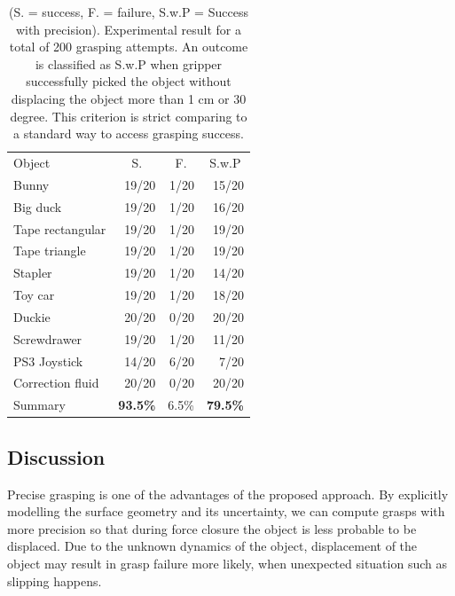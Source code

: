 \begin{table}[!htpb]
\centering
\begin{tabular}{lrrr}
Object           & \multicolumn{1}{c}{S.} & \multicolumn{1}{c}{F.} & \multicolumn{1}{c}{S.w.P} \\
Bunny            & 19/20                  & 1/20                   & 15/20                     \\
Big duck         & 19/20                  & 1/20                   & 16/20                     \\
Tape rectangular & 19/20                  & 1/20                   & 19/20                     \\
Tape triangle    & 19/20                  & 1/20                   & 19/20                     \\
Stapler          & 19/20                  & 1/20                   & 14/20                     \\
Toy car          & 19/20                  & 1/20                   & 18/20                     \\
Duckie           & 20/20                  & 0/20                   & 20/20                     \\
Screwdrawer      & 19/20                  & 1/20                   & 11/20                     \\
PS3 Joystick     & 14/20                  & 6/20                   & 7/20                      \\
Correction fluid & 20/20                  & 0/20                   & 20/20                     \\
Summary          & \textbf{93.5\%}        & 6.5\%            & \textbf{79.5\%}                  
\end{tabular}
\caption{(S. = success, F. = failure, S.w.P = Success with precision). Experimental result for a total of 200 grasping attempts. An outcome is classified as S.w.P when gripper successfully picked the object without displacing the object more than 1 cm or 30 degree. This criterion is strict comparing to a standard way to access grasping success.} 
\label{tab:result}
\end{table}


\subsection{Discussion} 
Precise grasping is one of the advantages of the proposed
approach. By explicitly modelling the surface geometry and
its uncertainty, we can compute grasps with more precision
so that during force closure the object is less probable to be displaced. Due to the unknown dynamics of the object, displacement of the object may result in grasp failure more likely, when unexpected situation such as slipping happens.

